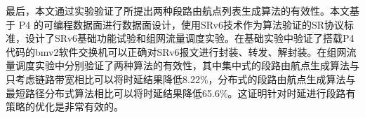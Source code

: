最后，本文通过实验验证了所提出两种段路由航点列表生成算法的有效性。本文基于 \gls*{P4} 的可编程数据面进行数据面设计，使用SRv6技术作为算法验证的SR协议标准，设计了SRv6基础功能试验和组网流量调度实验。在基础实验中验证了搭载P4代码的bmv2软件交换机可以正确对SRv6报文进行封装、转发、解封装。在组网流量调度实验中分别验证了两种算法的有效性，其中集中式的段路由航点生成算法与只考虑链路带宽相比可以将时延结果降低8.22\%，分布式的段路由航点生成算法与最短路径分布式算法相比可以将时延结果降低65.6\%。这证明针对时延进行段路有策略的优化是非常有效的。





